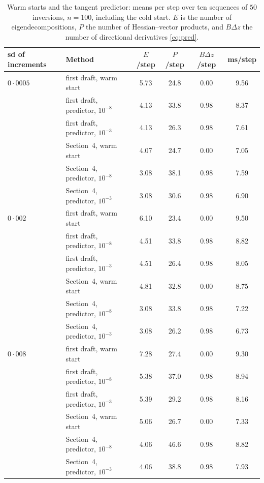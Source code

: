 \documentclass[11pt]{article}
\begin{document}
\begin{table}[h]
\centering
\caption{Warm starts and the tangent predictor: means per step over
ten sequences of $50$ inversions, $n=100$, including the cold start.
$E$ is the number of eigendecompositions, $P$ the number of
Hessian--vector products, and $B\Delta z$ the number of directional
derivatives \eqref{eq:pred}.}\label{tab:warmpred}
\medskip
\small
\begin{tabular}{llcccc}
\toprule
sd of increments & Method & $E$/step & $P$/step & $B\Delta z$/step & ms/step\\
\midrule
$0{\cdot}0005$ & first draft, warm start & 5.73 & 24.8 & 0.00 & 9.56\\
 & first draft, predictor, $10^{-8}$ & 4.13 & 33.8 & 0.98 & 8.37\\
 & first draft, predictor, $10^{-3}$ & 4.13 & 26.3 & 0.98 & 7.61\\
 & Section~4, warm start & 4.07 & 24.7 & 0.00 & 7.05\\
 & Section~4, predictor, $10^{-8}$ & 3.08 & 38.1 & 0.98 & 7.59\\
 & Section~4, predictor, $10^{-3}$ & 3.08 & 30.6 & 0.98 & 6.90\\
\addlinespace[2pt]
$0{\cdot}002$ & first draft, warm start & 6.10 & 23.4 & 0.00 & 9.50\\
 & first draft, predictor, $10^{-8}$ & 4.51 & 33.8 & 0.98 & 8.82\\
 & first draft, predictor, $10^{-3}$ & 4.51 & 26.4 & 0.98 & 8.05\\
 & Section~4, warm start & 4.81 & 32.8 & 0.00 & 8.75\\
 & Section~4, predictor, $10^{-8}$ & 3.08 & 33.8 & 0.98 & 7.22\\
 & Section~4, predictor, $10^{-3}$ & 3.08 & 26.2 & 0.98 & 6.73\\
\addlinespace[2pt]
$0{\cdot}008$ & first draft, warm start & 7.28 & 27.4 & 0.00 & 9.30\\
 & first draft, predictor, $10^{-8}$ & 5.38 & 37.0 & 0.98 & 8.94\\
 & first draft, predictor, $10^{-3}$ & 5.39 & 29.2 & 0.98 & 8.16\\
 & Section~4, warm start & 5.06 & 26.7 & 0.00 & 7.33\\
 & Section~4, predictor, $10^{-8}$ & 4.06 & 46.6 & 0.98 & 8.82\\
 & Section~4, predictor, $10^{-3}$ & 4.06 & 38.8 & 0.98 & 7.93\\
\bottomrule
\end{tabular}
\end{table}
\end{document}
